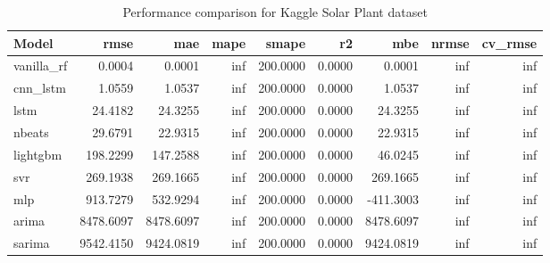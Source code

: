 \begin{table}
\caption{Performance comparison for Kaggle Solar Plant dataset}
\label{tab:kaggle_solar_plant_results}
\begin{tabular}{lrrrrrrrr}
\toprule
Model & rmse & mae & mape & smape & r2 & mbe & nrmse & cv_rmse \\
\midrule
vanilla_rf & 0.0004 & 0.0001 & inf & 200.0000 & 0.0000 & 0.0001 & inf & inf \\
cnn_lstm & 1.0559 & 1.0537 & inf & 200.0000 & 0.0000 & 1.0537 & inf & inf \\
lstm & 24.4182 & 24.3255 & inf & 200.0000 & 0.0000 & 24.3255 & inf & inf \\
nbeats & 29.6791 & 22.9315 & inf & 200.0000 & 0.0000 & 22.9315 & inf & inf \\
lightgbm & 198.2299 & 147.2588 & inf & 200.0000 & 0.0000 & 46.0245 & inf & inf \\
svr & 269.1938 & 269.1665 & inf & 200.0000 & 0.0000 & 269.1665 & inf & inf \\
mlp & 913.7279 & 532.9294 & inf & 200.0000 & 0.0000 & -411.3003 & inf & inf \\
arima & 8478.6097 & 8478.6097 & inf & 200.0000 & 0.0000 & 8478.6097 & inf & inf \\
sarima & 9542.4150 & 9424.0819 & inf & 200.0000 & 0.0000 & 9424.0819 & inf & inf \\
\bottomrule
\end{tabular}
\end{table}
